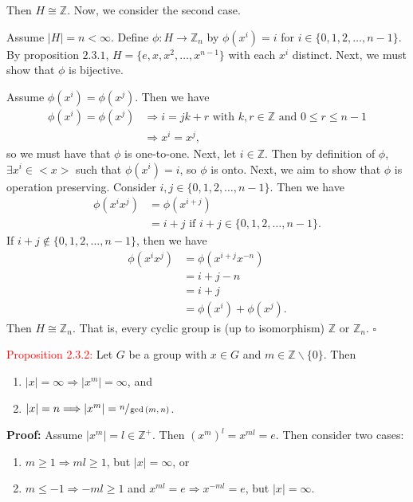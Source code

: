 \documentclass{article}
\begin{document}
Then $H \cong \mathbb{Z}$. Now, we consider the second case.

Assume $|H| = n < \infty$. Define $\phi:H \longrightarrow \mathbb{Z}_n$ by $\phi(x^i)=i$ for $i \in \{0,1,2, \dots, n-1\}$. By proposition 
$2.3.1$, $H = \{e,x,x^2, \dots, x^{n-1}\}$ with each $x^i$ distinct. Next, we must show 
that $\phi$ is bijective. 

Assume $\phi(x^i)=\phi(x^j)$. Then we have 
\begin{align*}
    \phi(x^i)=\phi(x^j) &\Longrightarrow i = jk+r \text{ with } k,r \in \mathbb{Z} \text{ and } 0 \leq r \leq n-1 \\
    &\Longrightarrow x^i=x^j,
\end{align*} 
so we must have that $\phi$ is one-to-one. Next, let $i \in \mathbb{Z}$. Then by definition of $\phi$, $\exists x^i \in <x>$ such that 
$\phi(x^i)=i$, so $\phi$ is onto. Next, we aim to show that $\phi$ is operation preserving. Consider $i,j \in \{0,1,2, \dots, n-1\}$. Then 
we have
\begin{align*}
    \phi(x^ix^j) &= \phi(x^{i+j}) \\
    &= i+j \text{ if } i+j \in \{0,1,2, \dots, n-1\}.
\end{align*}
If $i+j \notin \{0,1,2, \dots, n-1\}$, then we have
\begin{align*}
    \phi(x^ix^j) &= \phi(x^{i+j}x^{-n}) \\
    &= i+j-n \\
    &= i+j \\
    &= \phi(x^i)+\phi(x^j).
\end{align*}
Then $H \cong \mathbb{Z}_n$. That is, every cyclic group is (up to isomorphism) $\mathbb{Z}$ or $\mathbb{Z}_n$. $\square$

\textcolor{red}{Proposition 2.3.2:} Let $G$ be a group with $x \in G$ and $m \in \mathbb{Z} \backslash \{0\}$. Then
\begin{enumerate}
    \item $|x| = \infty \Longrightarrow |x^m| = \infty$, and 
    \item $|x| = n \Longrightarrow |x^m| = \sfrac{n}{\gcd{(m,n)}}$.
\end{enumerate}

\textbf{Proof:} Assume $|x^m| = l \in \mathbb{Z}^+$. Then $(x^m)^l = x^{ml} = e$. Then consider two cases:
\begin{enumerate} 
    \item $m \geq 1 \Longrightarrow ml \geq 1$, but $|x| = \infty$, or 
    \item $m \leq -1 \Longrightarrow -ml \geq 1$ and $x^{ml} = e \Longrightarrow x^{-ml} = e$, but $|x| = \infty$.
\end{enumerate}
\end{document}

